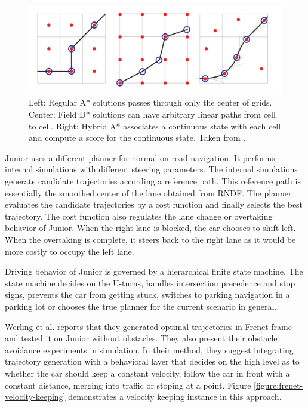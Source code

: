 \begin{figure}[h]
  \centering
  \includegraphics[width=.8\textwidth]{figures/hybridastar-comparison.png}
  \caption{Left: Regular A* solutions passes through only the center of grids.
    Center: Field D* solutions can have arbitrary linear paths from cell to cell.
    Right: Hybrid A* associates a continuous state with each cell and compute a
    score for the continuous state. Taken from \cite{Dolgov2010PathPF}.}
\label{figure:hybridastar-comparison}
\end{figure}

Junior uses a different planner for normal on-road navigation. It performs
internal simulations with different steering parameters. The internal
simulations generate candidate trajectories according a reference path. This
reference path is essentially the smoothed center of the lane obtained from
RNDF. The planner evaluates the candidate trajectories by a cost function and
finally selects the best trajectory. The cost function also regulates the lane
change or overtaking behavior of Junior. When the right lane is blocked, the
car chooses to shift left. When the overtaking is complete, it steers back to
the right lane as it would be more costly to occupy the left lane.

Driving behavior of Junior is governed by a hierarchical finite state machine.
The state machine decides on the U-turns, handles intersection precedence and
stop signs, prevents the car from getting stuck, switches to parking navigation
in a parking lot or chooses the true planner for the current scenario in
general.

Werling et al. \cite{Werling2010OptimalTG} reports that they generated optimal
trajectories in Frenet frame and tested it on Junior without obstacles. They
also present their obstacle avoidance experiments in simulation. In their
method, they suggest integrating trajectory generation with a behavioral layer
that decides on the high level as to whether the car should keep a constant
velocity, follow the car in front with a constant distance, merging into
traffic or stoping at a point. Figure \ref{figure:frenet-velocity-keeping}
demonstrates a velocity keeping instance in this approach.


